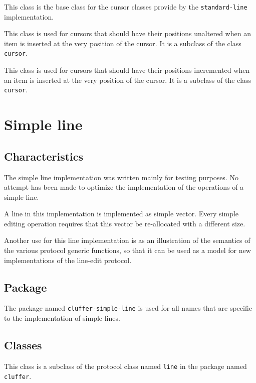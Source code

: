 This class is the base class for the cursor classes provide by the
\texttt{standard-line} implementation.


This class is used for cursors that should have their positions
unaltered when an item is inserted at the very position of the
cursor.   It is a subclass of the class \texttt{cursor}.


This class is used for cursors that should have their positions
incremented when an item is inserted at the very position of the
cursor.   It is a subclass of the class \texttt{cursor}.

\section{Simple line}
\label{sec-implementation-simple-line}

\subsection{Characteristics}

The simple line implementation was written mainly for testing
purposes.  No attempt has been made to optimize the implementation of
the operations of a simple line.

A line in this implementation is implemented as \commonlisp{} simple
vector.  Every simple editing operation requires that this vector be
re-allocated with a different size.

Another use for this line implementation is as an illustration of the
semantics of the various protocol generic functions, so that it can be
used as a model for new implementations of the line-edit protocol.

\subsection{Package}

The package named \texttt{cluffer-simple-line} is used for all names
that are specific to the implementation of simple lines.

\subsection{Classes}


This class is a subclass of the protocol class named \texttt{line} in
the package named \texttt{cluffer}.

